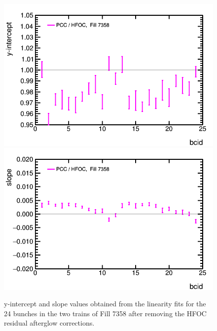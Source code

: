 \begin{figure}[hc]
\begin{center}
    \includegraphics[width=0.47\linewidth]{plots/sbilratios_trains_Fill7358/plot_det_linearity_perbx_y0_7358_NoHFCorr.png}
    \includegraphics[width=0.47\linewidth]{plots/sbilratios_trains_Fill7358/plot_det_linearity_perbx_slope_7358_NoHFCorr.png}
    \caption{
      y-intercept and slope values obtained from the linearity fits for the 24 bunches in the two trains of Fill 7358 after removing the HFOC residual afterglow corrections.
      \label{fig:fill7358trainslope_crosscheckHFOC}
    }

  \end{center}
\end{figure}


%
